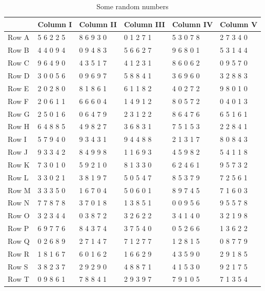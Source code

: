 \documentclass[
  11pt,
  a4paper,
  krantz2]{krantz}
\begin{document}
\begin{table}
\centering
\caption{\label{tab:unnamed-chunk-7}Some random numbers}
\centering
\fontsize{9}{11}\selectfont
\begin{tabular}[t]{llllll}
\toprule
\textbf{ } & \textbf{Column I} & \textbf{Column II} & \textbf{Column III} & \textbf{Column IV} & \textbf{Column V}\\
\midrule
Row A & 5 6 2 2 5 & 8 6 9 3 0 & 0 1 2 7 1 & 5 3 0 7 8 & 2 7 3 4 0\\
Row B & 4 4 0 9 4 & 0 9 4 8 3 & 5 6 6 2 7 & 9 6 8 0 1 & 5 3 1 4 4\\
Row C & 9 6 4 9 0 & 4 3 5 1 7 & 4 1 2 3 1 & 8 6 0 6 2 & 0 9 5 7 0\\
Row D & 3 0 0 5 6 & 0 9 6 9 7 & 5 8 8 4 1 & 3 6 9 6 0 & 3 2 8 8 3\\
Row E & 2 0 2 8 0 & 8 1 8 6 1 & 6 1 1 8 2 & 4 0 2 7 2 & 9 8 0 1 0\\
\addlinespace
Row F & 2 0 6 1 1 & 6 6 6 0 4 & 1 4 9 1 2 & 8 0 5 7 2 & 0 4 0 1 3\\
Row G & 2 5 0 1 6 & 0 6 4 7 9 & 2 3 1 2 2 & 8 6 4 7 6 & 6 5 1 6 1\\
Row H & 6 4 8 8 5 & 4 9 8 2 7 & 3 6 8 3 1 & 7 5 1 5 3 & 2 2 8 4 1\\
Row I & 5 7 9 4 0 & 9 3 4 3 1 & 9 4 4 8 8 & 2 1 3 1 7 & 8 0 8 4 3\\
Row J & 9 3 3 4 2 & 8 4 9 9 8 & 1 1 6 9 3 & 4 5 9 8 2 & 5 4 1 1 8\\
\addlinespace
Row K & 7 3 0 1 0 & 5 9 2 1 0 & 8 1 3 3 0 & 6 2 4 6 1 & 9 5 7 3 2\\
Row L & 3 3 0 2 1 & 3 8 1 9 7 & 5 0 5 4 7 & 8 5 3 7 9 & 7 2 5 6 1\\
Row M & 3 3 3 5 0 & 1 6 7 0 4 & 5 0 6 0 1 & 8 9 7 4 5 & 7 1 6 0 3\\
Row N & 7 7 8 7 8 & 3 7 0 1 8 & 1 3 8 5 1 & 0 0 9 5 6 & 9 5 5 7 8\\
Row O & 3 2 3 4 4 & 0 3 8 7 2 & 3 2 6 2 2 & 3 4 1 4 0 & 3 2 1 9 8\\
\addlinespace
Row P & 6 9 7 7 6 & 8 4 3 7 4 & 3 7 5 4 0 & 0 5 2 6 6 & 1 3 6 2 2\\
Row Q & 0 2 6 8 9 & 2 7 1 4 7 & 7 1 2 7 7 & 1 2 8 1 5 & 0 8 7 7 9\\
Row R & 1 8 1 6 7 & 6 0 1 6 2 & 1 6 6 2 9 & 4 3 5 9 0 & 2 9 1 8 5\\
Row S & 3 8 2 3 7 & 2 9 2 9 0 & 4 8 8 7 1 & 4 1 5 3 0 & 9 2 1 7 5\\
Row T & 0 9 8 6 1 & 7 8 8 4 1 & 2 9 3 9 7 & 7 9 1 0 5 & 7 1 3 5 4\\

\end{tabular}
\end{table}
\end{document}

